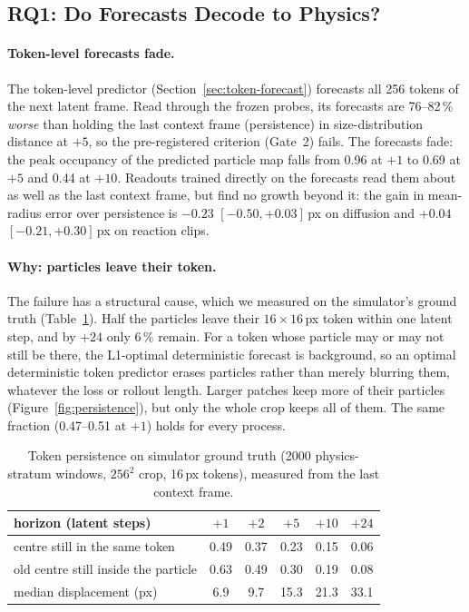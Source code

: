 \subsection{RQ1: Do Forecasts Decode to Physics?}
\label{sec:res-rq1}

\paragraph{Token-level forecasts fade.}
The token-level predictor (Section~\ref{sec:token-forecast}) forecasts all 256 tokens of
the next latent frame. Read through the frozen probes, its forecasts are 76--82\,\%
\emph{worse} than holding the last context frame (persistence) in size-distribution
distance at $+5$, so the pre-registered criterion (Gate~2) fails. The forecasts fade: the
peak occupancy of the predicted particle map falls from 0.96 at $+1$ to 0.69 at $+5$ and
0.44 at $+10$. Readouts trained directly on the forecasts read them about as well as the
last context frame, but find no growth beyond it: the gain in mean-radius error over
persistence is $-0.23$ $[-0.50, +0.03]$\,px on diffusion and $+0.04$ $[-0.21, +0.30]$\,px
on reaction clips.

\paragraph{Why: particles leave their token.}
The failure has a structural cause, which we measured on the simulator's ground truth
(Table~\ref{tab:token-persistence}). Half the particles leave their $16 \times 16$\,px
token within one latent step, and by $+24$ only 6\,\% remain. For a token whose particle
may or may not still be there, the L1-optimal deterministic forecast is background, so
an optimal deterministic token predictor erases particles rather than merely blurring
them, whatever the loss or rollout length. Larger patches keep more of their particles (Figure~\ref{fig:persistence}), but only the whole crop keeps all of them. The same fraction (0.47--0.51 at $+1$) holds
for every process.

\begin{table}[h]
  \centering
  \caption{Token persistence on simulator ground truth (2000 physics-stratum windows,
    $256^2$ crop, 16\,px tokens), measured from the last context frame.}
  \label{tab:token-persistence}
  \begin{tabular}{lccccc}
    \toprule
    horizon (latent steps) & $+1$ & $+2$ & $+5$ & $+10$ & $+24$ \\
    \midrule
    centre still in the same token & 0.49 & 0.37 & 0.23 & 0.15 & 0.06 \\
    old centre still inside the particle & 0.63 & 0.49 & 0.30 & 0.19 & 0.08 \\
    median displacement (px) & 6.9 & 9.7 & 15.3 & 21.3 & 33.1 \\
    \bottomrule
  \end{tabular}
\end{table}

